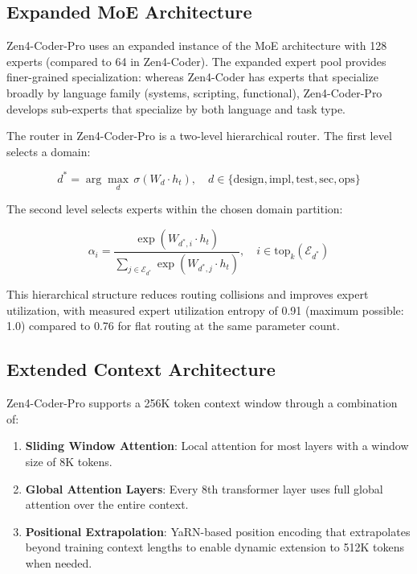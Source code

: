 \documentclass[11pt,a4paper]{article}
\begin{document}
\subsection{Expanded MoE Architecture}

Zen4-Coder-Pro uses an expanded instance of the MoE architecture with 128 experts (compared to 64 in Zen4-Coder). The expanded expert pool provides finer-grained specialization: whereas Zen4-Coder has experts that specialize broadly by language family (systems, scripting, functional), Zen4-Coder-Pro develops sub-experts that specialize by both language and task type.

The router in Zen4-Coder-Pro is a two-level hierarchical router. The first level selects a domain:

\begin{equation}
  d^* = \arg\max_d \, \sigma(W_d \cdot h_t), \quad d \in \{\text{design}, \text{impl}, \text{test}, \text{sec}, \text{ops}\}
\end{equation}

The second level selects experts within the chosen domain partition:

\begin{equation}
  \alpha_i = \frac{\exp(W_{d^*,i} \cdot h_t)}{\sum_{j \in \mathcal{E}_{d^*}} \exp(W_{d^*,j} \cdot h_t)}, \quad i \in \text{top}_k(\mathcal{E}_{d^*})
\end{equation}

This hierarchical structure reduces routing collisions and improves expert utilization, with measured expert utilization entropy of 0.91 (maximum possible: 1.0) compared to 0.76 for flat routing at the same parameter count.

\subsection{Extended Context Architecture}

Zen4-Coder-Pro supports a 256K token context window through a combination of:

\begin{enumerate}
  \item \textbf{Sliding Window Attention}: Local attention for most layers with a window size of 8K tokens.
  \item \textbf{Global Attention Layers}: Every 8th transformer layer uses full global attention over the entire context.
  \item \textbf{Positional Extrapolation}: YaRN-based position encoding that extrapolates beyond training context lengths to enable dynamic extension to 512K tokens when needed.
\end{enumerate}
\end{document}
